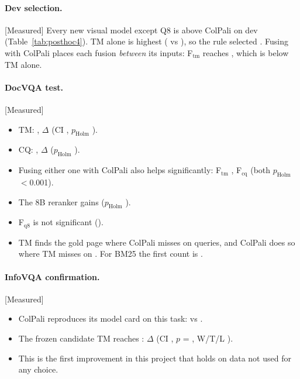 \documentclass[11pt,a4paper]{article}
\newcommand{\lbl}[2]{\textsf{\scriptsize\textcolor{#1}{[#2]}}}
\newcommand{\Mea}{\lbl{tagM}{Measured}}
\newcommand{\file}[1]{\texttt{\small\hyphenchar\font=`\/ #1}}
\begin{document}
\paragraph{Dev selection.} \Mea{} Every new visual model except Q8 is above ColPali on dev (Table~\ref{tab:posthoc4}). TM alone is highest (\devTM{} vs \devB{}), so the rule selected \candidate{}. Fusing with ColPali places each fusion \emph{between} its inputs: F$_\text{tm}$ reaches \devFtm{}, which is below TM alone.

\paragraph{DocVQA test.} \Mea{}
\begin{itemize}
  \item TM: \testTM{}, $\Delta$ \deltaTM{} (CI \deltaTMCI{}, $p_\text{Holm}$ \pHolmTM{}).
  \item CQ: \testCQ{}, $\Delta$ \deltaCQ{} ($p_\text{Holm}$ \pHolmCQ{}).
  \item Fusing either one with ColPali also helps significantly: F$_\text{tm}$ \deltaFtm{}, F$_\text{cq}$ \deltaFcq{} (both $p_\text{Holm}$ $<$0.001).
  \item The 8B reranker gains \deltaBvreight{} ($p_\text{Holm}$ \pHolmBvreight{}).
  \item F$_\text{q8}$ is not significant (\deltaFqeight{}).
  \item TM finds the gold page where ColPali misses on \headOnlyTM{} queries, and ColPali does so where TM misses on \headBOnlyTM{}. For BM25 the first count is \headallAnotB{}.
\end{itemize}

\paragraph{InfoVQA confirmation.} \Mea{}
\begin{itemize}
  \item ColPali reproduces its model card on this task: \infoB{} vs \infoPub{}.
  \item The frozen candidate TM reaches \infoTM{}: $\Delta$ \infoDelta{} (CI \infoDeltaCI{}, $p$ = \infoP{}, W/T/L \infoWTL{}).
  \item This is the first improvement in this project that holds on data not used for any choice.
\end{itemize}

\begin{table}[!htbp]\centering\small

\caption{\Mea{} Post-hoc set 4 on DocVQA, and the frozen candidate on InfoVQA (\file{results/posthoc4/}).}\label{tab:posthoc4}
\end{table}
\end{document}
